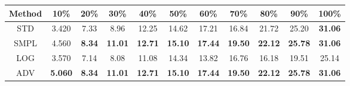 \documentclass{standalone}
\begin{document}
\begin{tabular}{c|cccccccccc}
      \toprule
      Method & 10\% & 20\% & 30\% & 40\% & 50\% & 60\% & 70\% & 80\% & 90\% & 100\% \\
      \midrule
STD & 3.420 & 7.33 & 8.96 & 12.25 & 14.62 & 17.21 & 16.84 & 21.72 & 25.20 & \textbf{31.06}\\
SMPL & 4.560 & \textbf{8.34} & \textbf{11.01} & \textbf{12.71} & \textbf{15.10} & \textbf{17.44} & \textbf{19.50} & \textbf{22.12} & \textbf{25.78} & \textbf{31.06}\\
LOG & 3.570 & 7.14 & 8.08 & 11.08 & 14.34 & 13.82 & 16.76 & 16.18 & 19.51 & 25.14\\
ADV & \textbf{5.060} & \textbf{8.34} & \textbf{11.01} & \textbf{12.71} & \textbf{15.10} & \textbf{17.44} & \textbf{19.50} & \textbf{22.12} & \textbf{25.78} & \textbf{31.06}\\
  \bottomrule
\end{tabular}
\end{document}
